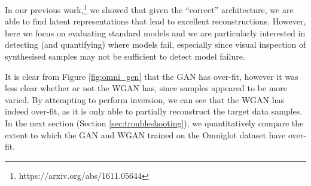 \documentclass[journal]{IEEEtran}
\begin{document}
In our previous work,\footnote{https://arxiv.org/abs/1611.05644} we showed that given the ``correct'' architecture, we are able to find latent representations that lead to excellent reconstructions. However, here we focus on evaluating standard models \cite{radford2015unsupervised} and we are particularly interested in detecting (and quantifying) where models fail, especially since visual inspection of synthesised samples may not be sufficient to detect model failure. 


It is clear from Figure \ref{fig:omni_gen} that the GAN has over-fit, however it was less clear whether or not the WGAN has, since samples appeared to be more varied. By attempting to perform inversion, we can see that the WGAN has indeed over-fit, as it is only able to partially reconstruct the target data samples. In the next section (Section \ref{sec:troubleshooting}), we quantitatively compare the extent to which the GAN and WGAN trained on the Omniglot dataset have over-fit.

\end{document}
